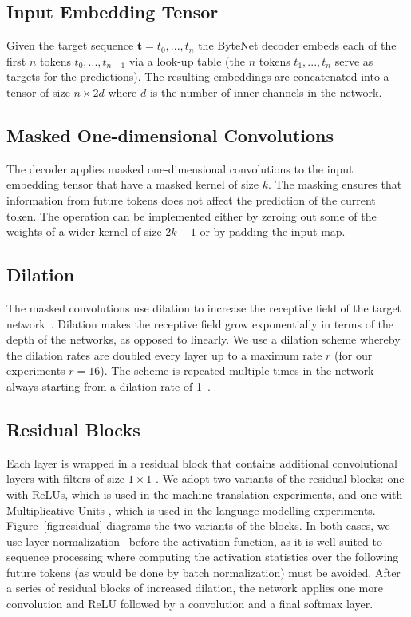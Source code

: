 \subsection{Input Embedding Tensor} Given the target sequence $\mathbf{t} = t_0,...,t_{n}$ the ByteNet decoder embeds each of the first $n$ tokens $t_0,...,t_{n-1}$ via a look-up table (the $n$ tokens $t_1,...,t_{n}$ serve as targets for the predictions). The resulting embeddings are concatenated into a tensor of size $n \times 2d$ where $d$ is the number of inner channels in the network.

\subsection{Masked One-dimensional Convolutions}
\label{masked}
The decoder applies masked one-dimensional convolutions \citep{van2016pixel} to the input embedding tensor that have a masked kernel of size $k$. The masking ensures that information from future tokens does not affect the prediction of the current token.  The operation can be implemented either by zeroing out some of the weights of a wider kernel of size $2k-1$ or by padding the input map. 

\subsection{Dilation}
\label{dilation}

The masked convolutions use dilation to increase the receptive field of the target network~\citep{DBLP:journals/corr/ChenPKMY14,DBLP:journals/corr/YuK15}. Dilation makes the receptive field grow exponentially in terms of the depth of the networks, as opposed to linearly.  We use a dilation scheme whereby the dilation rates are doubled every layer up to a maximum rate $r$ (for our experiments $r=16$). The scheme is repeated multiple times in the network always starting from a dilation rate of 1~\citep{wavenet,vpn}. 

\subsection{Residual Blocks}

Each layer is wrapped in a residual block that contains additional convolutional layers with filters of size $1\times1$ \citep{DBLP:journals/corr/HeZR016}. We adopt two variants of the residual blocks: one with ReLUs, which is used in the machine translation experiments, and one with Multiplicative Units \citep{vpn}, which is used in the language modelling experiments. Figure~\ref{fig:residual} diagrams the two variants of the blocks. In both cases, we use layer normalization~\citep{DBLP:journals/corr/BaKH16} before the activation function, as it is well suited to sequence processing where computing the activation statistics over the following future tokens (as would be done by batch normalization) must be avoided. After a series of residual blocks of increased dilation, the network applies one more convolution  and ReLU followed by a convolution and a final softmax layer.

